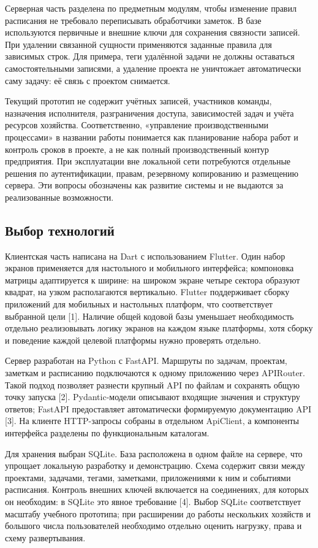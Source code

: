 \documentclass[14pt,a4paper]{extarticle}
\begin{document}
Серверная часть разделена по предметным модулям, чтобы изменение правил расписания не требовало переписывать обработчики заметок. В базе используются первичные и внешние ключи для сохранения связности записей. При удалении связанной сущности применяются заданные правила для зависимых строк. Для примера, теги удалённой задачи не должны оставаться самостоятельными записями, а удаление проекта не уничтожает автоматически саму задачу: её связь с проектом снимается.

Текущий прототип не содержит учётных записей, участников команды, назначения исполнителя, разграничения доступа, зависимостей задач и учёта ресурсов хозяйства. Соответственно, «управление производственными процессами» в названии работы понимается как планирование набора работ и контроль сроков в проекте, а не как полный производственный контур предприятия. При эксплуатации вне локальной сети потребуются отдельные решения по аутентификации, правам, резервному копированию и размещению сервера. Эти вопросы обозначены как развитие системы и не выдаются за реализованные возможности.

\subsection{Выбор технологий}

Клиентская часть написана на Dart с использованием Flutter. Один набор экранов применяется для настольного и мобильного интерфейса; компоновка матрицы адаптируется к ширине: на широком экране четыре сектора образуют квадрат, на узком располагаются вертикально. Flutter поддерживает сборку приложений для мобильных и настольных платформ, что соответствует выбранной цели {[}1{]}. Наличие общей кодовой базы уменьшает необходимость отдельно реализовывать логику экранов на каждом языке платформы, хотя сборку и поведение каждой целевой платформы нужно проверять отдельно.

Сервер разработан на Python с FastAPI. Маршруты по задачам, проектам, заметкам и расписанию подключаются к одному приложению через APIRouter. Такой подход позволяет разнести крупный API по файлам и сохранять общую точку запуска {[}2{]}. Pydantic-модели описывают входящие значения и структуру ответов; FastAPI предоставляет автоматически формируемую документацию API {[}3{]}. На клиенте HTTP-запросы собраны в отдельном ApiClient, а компоненты интерфейса разделены по функциональным каталогам.

Для хранения выбран SQLite. База расположена в одном файле на сервере, что упрощает локальную разработку и демонстрацию. Схема содержит связи между проектами, задачами, тегами, заметками, приложениями к ним и событиями расписания. Контроль внешних ключей включается на соединениях, для которых он необходим: в SQLite это явное требование {[}4{]}. Выбор SQLite соответствует масштабу учебного прототипа; при расширении до работы нескольких хозяйств и большого числа пользователей необходимо отдельно оценить нагрузку, права и схему развертывания.
\end{document}
